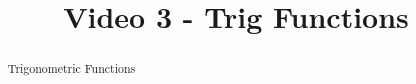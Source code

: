 \documentclass[handout]{ximera}
\title{Video 3 - Trig Functions}
\begin{document}
\begin{abstract}
Trigonometric Functions
\end{abstract}

\maketitle

\end{document}
